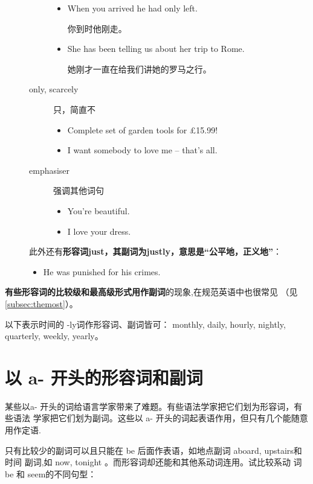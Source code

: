 \begin{description}
\begin{description}
\begin{itemize}
    \item When you arrived he had only  left.

      你到时他刚走。
    \item She has  been telling us about her trip to Rome.

      她刚才一直在给我们讲她的罗马之行。
    \end{itemize}

  \item[only, scarcely] 只，简直不
    \begin{itemize}
    \item Complete set of garden tools for  £15.99!
    \item I  want somebody to love me – that's all.
    \end{itemize}

  \item[emphasiser] 强调其他词句
    \begin{itemize}
    \item You're  beautiful.

    \item I  love your dress.
    \end{itemize}
  \end{description}

  此外还有\textbf{形容词just，其副词为justly，意思是“公平地，正义地”}：
  \begin{itemize}
  \item He was  punished for his crimes.
  \end{itemize}
\end{description}


\textbf{有些形容词的比较级和最高级形式用作副词}的现象,在规范英语中也很常见
（见\cref{subsec:themost}）。

以下表示时间的 -ly词作形容词、副词皆可： monthly, daily, hourly, nightly,
quarterly, weekly, yearly。

\section{以 a- 开头的形容词和副词}

某些以a- 开头的词给语言学家带来了难题。有些语法学家把它们划为形容词，有些语法
学家把它们划为副词。这些以 a- 开头的词起表语作用，但只有几个能随意用作定语.

只有比较少的副词可以且只能在 be 后面作表语，如地点副词 aboard, upstairs和时间
副词,如 now, tonight 。而形容词却还能和其他系动词连用。试比较系动
词 be 和 seem的不同句型：


